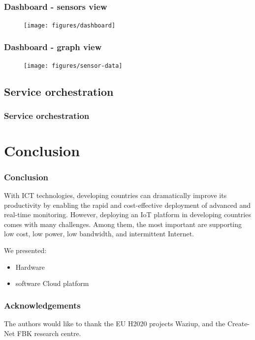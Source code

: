 \documentclass{beamer}
\begin{document}
\begin{frame}
\frametitle{Dashboard - sensors view}

  \begin{figure}[H]  
  \centering  
  \texttt{[image: figures/dashboard]} 
  \label{fig-dashboard}
  \end{figure}

\end{frame}
  
\begin{frame}
\frametitle{Dashboard - graph view}

\vspace{-1cm}
  \begin{figure} 
  \centering  
  \texttt{[image: figures/sensor-data]}
  \label{fig-sensor-data}
  \end{figure}
 
\end{frame}

\subsection{Service orchestration}


\begin{frame}
\frametitle{Service orchestration}

\end{frame}



\section{Conclusion}

\begin{frame}
\frametitle{Conclusion}
  
With ICT technologies, developing countries can dramatically improve its productivity by enabling the rapid and cost-effective deployment of advanced and real-time monitoring.
However, deploying an IoT platform in developing countries comes with many challenges.
Among them, the most important are supporting low cost, low power, low bandwidth, and intermittent Internet.

We presented:
  \begin{itemize}
    \item Hardware
    \item software Cloud platform 
  \end{itemize}

\end{frame}


\begin{frame}
\frametitle{Acknowledgements}

The authors would like to thank the EU H2020 projects Waziup, and the Create-Net FBK research centre. \\

\end{frame}
\end{document}
